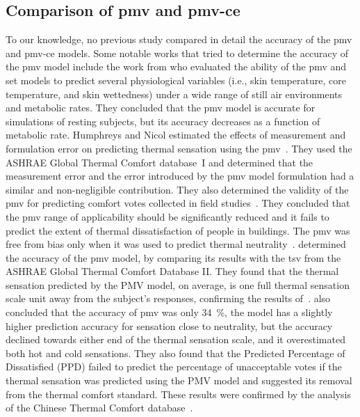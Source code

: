 \subsection{Comparison of \ac{pmv} and \ac{pmv-ce}}\label{subsec:comparision-of-pmv-formulations}
To our knowledge, no previous study compared in detail the accuracy of the \ac{pmv} and \ac{pmv-ce} models.
Some notable works that tried to determine the accuracy of the \ac{pmv} model include the work from  who evaluated the ability of the \ac{pmv} and \ac{set} models to predict several physiological variables (i.e., skin temperature, core temperature, and skin wettedness) under a wide range of still air environments and metabolic rates.
They concluded that the \ac{pmv} model is accurate for simulations of resting subjects, but its accuracy decreases as a function of metabolic rate.
Humphreys and Nicol estimated the effects of measurement and formulation error on predicting thermal sensation using the \ac{pmv}~\cite{Humphreys2000}.
They used the ASHRAE Global Thermal Comfort database~I and determined that the measurement error and the error introduced by the \ac{pmv} model formulation had a similar and non-negligible contribution.
They also determined the validity of the \ac{pmv} for predicting comfort votes collected in field studies~\cite{Humphreys2002}.
They concluded that the \ac{pmv} range of applicability should be significantly reduced and it fails to predict the extent of thermal dissatisfaction of people in buildings.
The \ac{pmv} was free from bias only when it was used to predict thermal neutrality~\cite{Humphreys2002}.
 determined the accuracy of the \ac{pmv} model, by comparing its results with the \ac{tsv} from the ASHRAE Global Thermal Comfort Database II.
They found that the thermal sensation predicted by the PMV model, on average, is one full thermal sensation scale unit away from the subject’s responses, confirming the results of~.
 also concluded that the accuracy of \ac{pmv} was only \qty{34}{\percent}, the model has a slightly higher prediction accuracy for sensation close to neutrality, but the accuracy declined towards either end of the thermal sensation scale, and it overestimated both hot and cold sensations.
They also found that the Predicted Percentage of Dissatisfied (PPD) failed to predict the percentage of unacceptable votes if the thermal sensation was predicted using the PMV model and suggested its removal from the thermal comfort standard.
These results were confirmed by the analysis of the Chinese Thermal Comfort database~\cite{du_evaluation_2022}.
